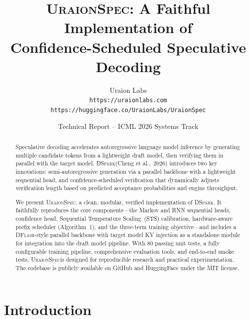 \documentclass[11pt,a4paper]{article}
\newcommand{\UraionSpec}{\textsc{UraionSpec}}
\newcommand{\DSpark}{\textsc{DSpark}}
\newcommand{\DFlash}{\textsc{DFlash}}
\begin{document}
\title{\textbf{\UraionSpec}: A Faithful Implementation of \\ Confidence-Scheduled Speculative Decoding}

\author{%
  \normalsize Uraion Labs \\[4pt]
  \texttt{https://uraionlabs.com} \\[2pt]
  \texttt{https://huggingface.co/UraionLabs/UraionSpec}
}

\date{\normalsize Technical Report -- ICML 2026 Systems Track}

\maketitle

\begin{abstract}
Speculative decoding accelerates autoregressive language model inference by
generating multiple candidate tokens from a lightweight draft model, then
verifying them in parallel with the target model. \DSpark (Cheng et al.,~2026)
introduces two key innovations: semi-autoregressive generation via a parallel
backbone with a lightweight sequential head, and confidence-scheduled
verification that dynamically adjusts verification length based on predicted
acceptance probabilities and engine throughput.

We present \UraionSpec, a clean, modular, verified implementation of
\DSpark. It faithfully reproduces the core
components---the Markov and RNN sequential heads, confidence head, Sequential
Temperature Scaling~(STS) calibration, hardware-aware prefix scheduler
(Algorithm~1), and the three-term training objective---and includes a
\DFlash-style parallel backbone with target model KV injection as a
standalone module for integration into the draft model pipeline.
With 80 passing unit tests, a fully
configurable training pipeline, comprehensive evaluation tools, and
end-to-end smoke tests, \UraionSpec is designed for reproducible research
and practical experimentation. The codebase is publicly available on
GitHub and HuggingFace under the MIT license.
\end{abstract}

\section{Introduction}
\label{sec:introduction}
\end{document}
